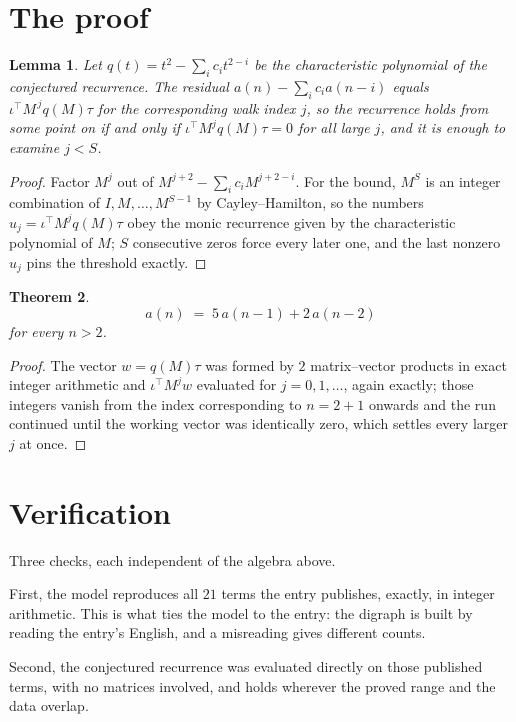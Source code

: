 \documentclass[11pt,a4paper]{article}
\theoremstyle{plain}
\newtheorem{theorem}{Theorem}
\newtheorem{lemma}[theorem]{Lemma}
\theoremstyle{definition}
\begin{document}
\section{The proof}

\begin{lemma}\label{lem:crit}
Let $q(t)=t^{2}-\sum_i c_it^{2-i}$ be the characteristic polynomial of the
conjectured recurrence. The residual $a(n)-\sum_ic_ia(n-i)$ equals
$\iota^{\!\top}M^{\,j}q(M)\tau$ for the corresponding walk index $j$, so the recurrence
holds from some point on if and only if $\iota^{\!\top}M^{j}q(M)\tau=0$ for all large $j$,
and it is enough to examine $j<S$.
\end{lemma}

\begin{proof}
Factor $M^{j}$ out of $M^{j+2}-\sum_ic_iM^{j+2-i}$. For the bound, $M^{S}$
is an integer combination of $I,M,\dots,M^{S-1}$ by Cayley--Hamilton, so the numbers
$u_j=\iota^{\!\top}M^{j}q(M)\tau$ obey the monic recurrence given by the characteristic
polynomial of $M$; $S$ consecutive zeros force every later one, and the last nonzero $u_j$
pins the threshold exactly.
\end{proof}

\begin{theorem}
\[
a(n)\;=\;5\,a(n-1) + 2\,a(n-2)
\]
for every $n>2$.
\end{theorem}

\begin{proof}
The vector $w=q(M)\tau$ was formed by $2$ matrix--vector products in exact integer
arithmetic and $\iota^{\!\top}M^{j}w$ evaluated for $j=0,1,\dots$, again exactly; those
integers vanish from the index corresponding to $n=2+1$ onwards and the run continued
until the working vector was identically zero, which settles every larger $j$ at once.
\end{proof}

\section{Verification}

Three checks, each independent of the algebra above.

First, the model reproduces all $21$ terms the entry publishes, exactly, in integer
arithmetic. This is what ties the model to the entry: the digraph is built by reading the
entry's English, and a misreading gives different counts.

Second, the conjectured recurrence was evaluated directly on those published terms, with no
matrices involved, and holds wherever the proved range and the data overlap.
\end{document}
